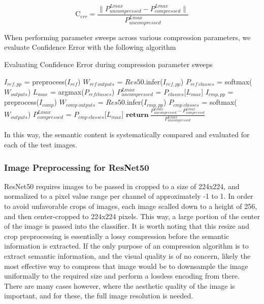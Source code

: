 $$
\textrm{C}_{err} = \frac{\|P^{Lmax}_{uncompressed} - P^{Lmax}_{compressed}\|}{P^{Lmax}_{uncompressed}}
$$

When performing parameter sweeps across various compression parameters, we evaluate Confidence Error with the following algorithm
\begin{algorithm}
    \label{alg:Confidence Error Algorithm}
    \caption{Evaluating Confidence Error during compression parameter sweeps}
	\begin{algorithmic}[1]
	\State $I_{ref, pp}$ = preprocess($I_{ref}$)
	\State $W_{ref \ outputs}$ = $Res50$.infer($I_{ref, pp}$)
	\State $P_{ref \ classes}$ = softmax($W_{outputs}$)
	\State $L_{max}$ = argmax({$P_{ref classes}$})
	\State $P^{Lmax}_{uncompressed}$ = $P_{classes}$[$L_{max}$]
	\State $I_{cmp, pp}$ = preprocess($I_{comp}$)
	\State $W_{comp \ outputs}$ = $Res50$.infer($I_{cmp, pp}$)
	\State $P_{cmp \ classes}$ = softmax($W_{outputs}$)
	\State $P^{Lmax}_{compressed}$ =  $P_{cmp \ classes}$[$L_{max}$]
	\State $\textbf{return}\ \frac{P^{Lmax}_{uncompressed} - P^{Lmax}_{compressed}}{P^{Lmax}_{uncompressed}}$
	\end{algorithmic}
\end{algorithm}


In this way, the semantic content is systematically compared and evaluated for each of the test images.

\subsubsection{Image Preprocessing for ResNet50}

ResNet50 requires images to be passed in cropped to a size of 224x224, and normalized to a pixel value range per channel of approximately -1 to 1. In order to avoid unfavorable crops of images, each image scalled down to a height of 256, and then center-cropped to 224x224 pixels. This way, a large portion of the center of the image is passed into the classifier. It is worth noting that this resize and crop preprocessing is essentially a lossy compression before the semantic information is extracted. If the only purpose of an compression algorithm is to extract semantic information, and the visual quality is of no concern, likely the most effective way to compress that image would be to downsample the image uniformally to the required size and perform a lossless encoding from there. There are many cases however, where the aesthetic quality of the image is important, and for these, the full image resolution is needed.

